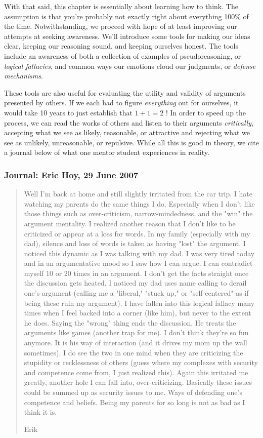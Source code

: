 With that said, this chapter is essentially about learning how to think. The assumption is that you're probably not exactly right about everything 100\% of the time. Notwithstanding, we proceed with hope of at least improving our attempts at seeking awareness. We'll introduce some tools for making our ideas clear, keeping our reasoning sound, and keeping ourselves honest. The tools include an awareness of both a collection of examples of pseudoreasoning, or \emph{logical fallacies}, and common ways our emotions cloud our judgments, or \emph{defense mechanisms}.

These tools are also useful for evaluating the utility and validity of arguments presented by others. If we each had to figure \emph{everything} out for ourselves, it would take 10 years to just establish that $1+1=2$ \cite{WhRu:62}! In order to speed up the process, we can read the works of others and listen to their arguments \emph{critically}, accepting what we see as likely, reasonable, or attractive and rejecting what we see as unlikely, unreasonable, or repulsive. While all this is good in theory, we cite a journal below of what one mentor student experiences in reality.

\subsubsection{Journal: Eric Hoy, 29 June 2007}

\begin{quotation}
Well I'm back at home and still slightly irritated from the car trip. I hate watching my parents do the same things I do. Especially when I don't like those things such as over-criticism, narrow-mindedness, and the "win" the argument mentality. I realized another reason that I don't like to be criticized or appear at a loss for words. In my family (especially with my dad), silence and loss of words is taken as having "lost" the argument. I noticed this dynamic as I was talking with my dad. I was very tired today and in an argumentative mood so I saw how I can argue. I can contradict myself 10 or 20 times in an argument. I don't get the facts straight once the discussion gets heated. I noticed my dad uses name calling to derail one's argument (calling me a "liberal," "stuck up," or "self-centered" as if being these ruin my argument). I have fallen into this logical fallacy many times when I feel backed into a corner (like him), but never to the extent he does. Saying the "wrong" thing ends the discussion. He treats the arguments like games (another trap for me). I don't think they're so fun anymore. It is his way of interaction (and it drives my mom up the wall sometimes). I do see the two in one mind when they are criticizing the stupidity or recklessness of others (guess where my complexes with security and competence come from, I just realized this). Again this irritated me greatly, another hole I can fall into, over-criticizing. Basically these issues could be summed up as security issues to me. Ways of defending one's competence and beliefs. Being my parents for so long is not as bad as I think it is.

Erik
\end{quotation}


